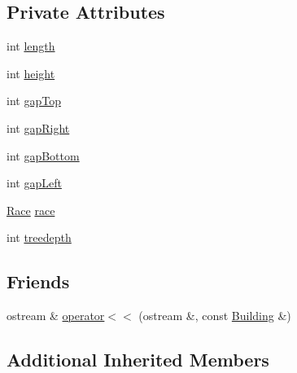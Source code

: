 \subsection*{Private Attributes}
\begin{DoxyCompactItemize}
\item 
int \hyperlink{classghost_1_1Building_a19d6a2258d7d455607dd056f5ed7d390}{length}
\item 
int \hyperlink{classghost_1_1Building_a2245674ef580e60ef2b3e908df930e41}{height}
\item 
int \hyperlink{classghost_1_1Building_a6b95d50f1677590d310759c828c8bf48}{gap\-Top}
\item 
int \hyperlink{classghost_1_1Building_a4c6f038b8f927d47d1cbfeb4c21fa29c}{gap\-Right}
\item 
int \hyperlink{classghost_1_1Building_a720db34cd6c7a1c6af1ff376192ae017}{gap\-Bottom}
\item 
int \hyperlink{classghost_1_1Building_a2a4c6779842047d5ec30c4a0b600c27e}{gap\-Left}
\item 
\hyperlink{namespaceghost_a8b1db75c40c6980adcf244ddccc0324b}{Race} \hyperlink{classghost_1_1Building_a8192def1fb4bdf85ee44cd99dd04f598}{race}
\item 
int \hyperlink{classghost_1_1Building_a9cce7581682e78208edde8ed462afe14}{treedepth}
\end{DoxyCompactItemize}
\subsection*{Friends}
\begin{DoxyCompactItemize}
\item 
ostream \& \hyperlink{classghost_1_1Building_a2a301d5694a033118e4812c26ae7707c}{operator$<$$<$} (ostream \&, const \hyperlink{classghost_1_1Building}{Building} \&)
\end{DoxyCompactItemize}
\subsection*{Additional Inherited Members}


